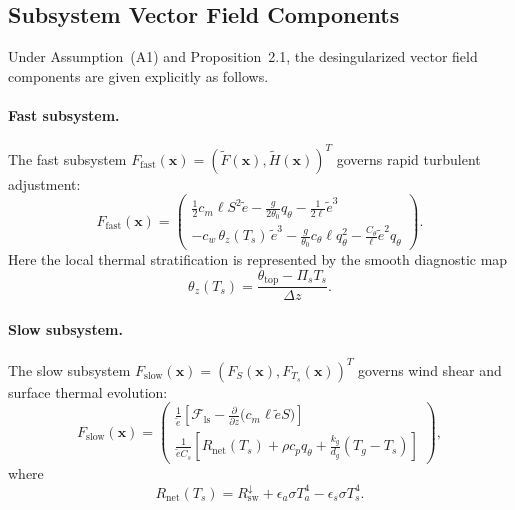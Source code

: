 \subsection{Subsystem Vector Field Components}

Under Assumption~(A1) and Proposition~2.1, the desingularized vector field components are given explicitly as follows.

\paragraph{Fast subsystem.}
The fast subsystem $F_{\mathrm{fast}}(\mathbf{x}) = (\tilde F(\mathbf{x}), \tilde H(\mathbf{x}))^T$ governs rapid turbulent adjustment:
\begin{equation}
F_{\mathrm{fast}}(\mathbf{x})
= \begin{pmatrix}
\frac{1}{2} c_m \ell S^2 \tilde e - \frac{g}{2\theta_0} q_\theta - \frac{1}{2\ell} \tilde e^3 \\
- c_w \, \theta_z(T_s) \, \tilde e^3 - \frac{g}{\theta_0} c_\theta \ell q_\theta^2 - \frac{C_\theta}{\ell} \tilde e^2 q_\theta
\end{pmatrix}.
\end{equation}
Here the local thermal stratification is represented by the smooth diagnostic map
\begin{equation}
\theta_z(T_s) = \frac{\theta_{\mathrm{top}} - \Pi_s T_s}{\Delta z}.
\end{equation}

\paragraph{Slow subsystem.}
The slow subsystem $F_{\mathrm{slow}}(\mathbf{x}) = (F_S(\mathbf{x}), F_{T_s}(\mathbf{x}))^T$ governs wind shear and surface thermal evolution:
\begin{equation}
F_{\mathrm{slow}}(\mathbf{x})
= \begin{pmatrix}
\frac{1}{\tilde e}\left[\mathcal{F}_{\mathrm{ls}} - \frac{\partial}{\partial z}\big(c_m \ell \tilde e S\big)\right] \\
\frac{1}{\tilde e C_s}\left[R_{\mathrm{net}}(T_s) + \rho c_p q_\theta + \frac{k_g}{d_g}(T_g - T_s)\right]
\end{pmatrix},
\end{equation}
where
\begin{equation}
R_{\mathrm{net}}(T_s)
= R_{\mathrm{sw}}^{\downarrow} + \epsilon_a \sigma T_a^4 - \epsilon_s \sigma T_s^4.
\end{equation}

